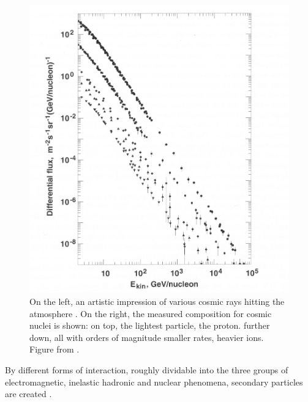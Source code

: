\begin{figure}
\begin{minipage}[d]{0.49 \textwidth}
		  \includegraphics[width=\textwidth]{graphics/cosmicRays/energySpectrum.png}
	\end{minipage}
	\caption[Cosmic ray composition]{On the left, an artistic impression of various cosmic rays hitting the atmosphere \cite{airShower}. On the right, the measured composition for cosmic nuclei is shown: on top, the lightest particle, the proton. further down, all with orders of magnitude smaller rates, heavier ions. Figure from \cite{highEnergyCosmicRays}.}
	\label{fig:Introduction:sec:CosmicRays}
    \end{figure}
    By different forms of interaction, roughly dividable into the three groups of electromagnetic, inelastic hadronic and nuclear phenomena, secondary particles are created \cite{highEnergyCosmicRays, Grupen}. 
